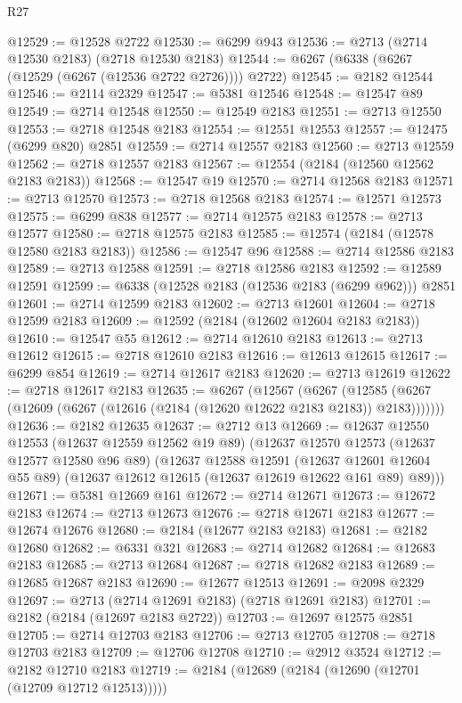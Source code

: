 \begin{lexlean}{R27}
\begin{coremodule}
@12529 := @12528 @2722
@12530 := @6299 @943
@12536 := @2713 (@2714 @12530 @2183) (@2718 @12530 @2183)
@12544 := @6267 (@6338 (@6267 (@12529 (@6267 (@12536 @2722 @2726)))) @2722)
@12545 := @2182 @12544
@12546 := @2114 @2329
@12547 := @5381 @12546
@12548 := @12547 @89
@12549 := @2714 @12548
@12550 := @12549 @2183
@12551 := @2713 @12550
@12553 := @2718 @12548 @2183
@12554 := @12551 @12553
@12557 := @12475 (@6299 @820) @2851
@12559 := @2714 @12557 @2183
@12560 := @2713 @12559
@12562 := @2718 @12557 @2183
@12567 := @12554 (@2184 (@12560 @12562 @2183 @2183))
@12568 := @12547 @19
@12570 := @2714 @12568 @2183
@12571 := @2713 @12570
@12573 := @2718 @12568 @2183
@12574 := @12571 @12573
@12575 := @6299 @838
@12577 := @2714 @12575 @2183
@12578 := @2713 @12577
@12580 := @2718 @12575 @2183
@12585 := @12574 (@2184 (@12578 @12580 @2183 @2183))
@12586 := @12547 @96
@12588 := @2714 @12586 @2183
@12589 := @2713 @12588
@12591 := @2718 @12586 @2183
@12592 := @12589 @12591
@12599 := @6338 (@12528 @2183 (@12536 @2183 (@6299 @962))) @2851
@12601 := @2714 @12599 @2183
@12602 := @2713 @12601
@12604 := @2718 @12599 @2183
@12609 := @12592 (@2184 (@12602 @12604 @2183 @2183))
@12610 := @12547 @55
@12612 := @2714 @12610 @2183
@12613 := @2713 @12612
@12615 := @2718 @12610 @2183
@12616 := @12613 @12615
@12617 := @6299 @854
@12619 := @2714 @12617 @2183
@12620 := @2713 @12619
@12622 := @2718 @12617 @2183
@12635 := @6267
    (@12567
      (@6267 (@12585 (@6267 (@12609 (@6267 (@12616 (@2184 (@12620 @12622 @2183 @2183)) @2183)))))))
@12636 := @2182 @12635
@12637 := @2712 @13
@12669 := @12637
    @12550
    @12553
    (@12637 @12559 @12562 @19 @89)
    (@12637
      @12570
      @12573
      (@12637 @12577 @12580 @96 @89)
      (@12637
        @12588
        @12591
        (@12637 @12601 @12604 @55 @89)
        (@12637 @12612 @12615 (@12637 @12619 @12622 @161 @89) @89)))
@12671 := @5381 @12669 @161
@12672 := @2714 @12671
@12673 := @12672 @2183
@12674 := @2713 @12673
@12676 := @2718 @12671 @2183
@12677 := @12674 @12676
@12680 := @2184 (@12677 @2183 @2183)
@12681 := @2182 @12680
@12682 := @6331 @321
@12683 := @2714 @12682
@12684 := @12683 @2183
@12685 := @2713 @12684
@12687 := @2718 @12682 @2183
@12689 := @12685 @12687 @2183
@12690 := @12677 @12513
@12691 := @2098 @2329
@12697 := @2713 (@2714 @12691 @2183) (@2718 @12691 @2183)
@12701 := @2182 (@2184 (@12697 @2183 @2722))
@12703 := @12697 @12575 @2851
@12705 := @2714 @12703 @2183
@12706 := @2713 @12705
@12708 := @2718 @12703 @2183
@12709 := @12706 @12708
@12710 := @2912 @3524
@12712 := @2182 @12710 @2183
@12719 := @2184 (@12689 (@2184 (@12690 (@12701 (@12709 @12712 @12513)))))

\end{coremodule}
\end{lexlean}
